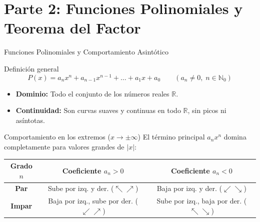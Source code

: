 \documentclass[aspectratio=169]{beamer}
\begin{document}
\section{Parte 2: Funciones Polinomiales y Teorema del Factor}


\begin{frame}{Funciones Polinomiales y Comportamiento Asintótico}
  \begin{block}{Definición general}
    $$P(x) = a_n x^n + a_{n-1}x^{n-1} + \dots + a_1 x + a_0 \qquad (a_n \neq 0, \; n \in \mathbb{N}_0)$$
    \begin{itemize}
      \item \textbf{Dominio:} Todo el conjunto de los números reales $\mathbb{R}$.
      \item \textbf{Continuidad:} Son curvas suaves y continuas en todo $\mathbb{R}$, sin picos ni asíntotas.
    \end{itemize}
  \end{block}

  \vspace{4pt}
  \begin{block}{Comportamiento en los extremos ($x \to \pm\infty$)}
    El término principal $a_n x^n$ domina completamente para valores grandes de $|x|$:
    \begin{center}
      \small
      \begin{tabular}{ccc}
        \toprule
        \textbf{Grado $n$} & \textbf{Coeficiente $a_n > 0$} & \textbf{Coeficiente $a_n < 0$} \\
        \midrule
        \textbf{Par} & Sube por izq. y der. ($\nwarrow \nearrow$) & Baja por izq. y der. ($\swarrow \searrow$) \\
        \textbf{Impar} & Baja por izq., sube por der. ($\swarrow \nearrow$) & Sube por izq., baja por der. ($\nwarrow \searrow$) \\
        \bottomrule
      \end{tabular}
    \end{center}
  \end{block}
\end{frame}
\end{document}
